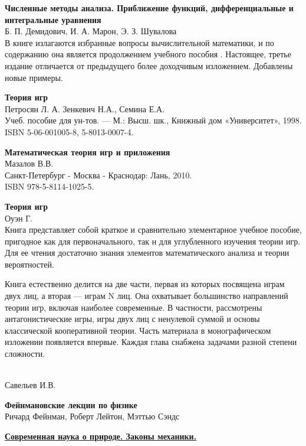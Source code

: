 \begin{thebibliography}{99}
\textbf{Численные методы анализа. Приближение функций, дифференциальные и
интегральные уравнения}\\
Б. П. Демидович, И. А. Марон, Э. З. Шувалова\\
В книге излагаются избранные вопросы вычислительной математики, и по содержанию
она является продолжением учебного пособия \cite{demacalc}.
Настоящее, третье издание отличается от предыдущего более доходчивым изложением.
Добавлены новые примеры.


\textbf{Теория игр}\\
Петросян Л. А. Зенкевич Н.А., Семина Е.А.\\
Учеб. пособие для ун-тов. — М.: Высш.
шк., Книжный дом «Университет», 1998.\\
ISBN 5-06-001005-8, 5-8013-0007-4.

\textbf{Математическая теория игр и приложения}\\
Мазалов В.В.\\
Санкт-Петербург - Москва - Краснодар: Лань, 2010.\\
ISBN 978-5-8114-1025-5.

\textbf{Теория игр}\\
Оуэн Г.\\
Книга представляет собой краткое и сравнительно элементарное учебное пособие,
пригодное как для первоначального, так н для углубленного изучения теории игр.
Для ее чтения достаточно знания элементов математического анализа и теории
вероятностей.

Книга естественно делится на две части, первая из которых посвящена играм двух
лиц, а вторая — играм N лиц. Она охватывает большинство направлений теории игр,
включая наиболее современные. В частности, рассмотрены антагонистические игры,
игры двух лиц с ненулевой суммой и основы классической кооперативной теории.
Часть материала в монографическом изложении появляется впервые. Каждая глава
снабжена задачами разной степени сложности.


 \\
Савельев И.В.

\textbf{Фейнмановские лекции по физике}\\
Ричард Фейнман, Роберт Лейтон, Мэттью Сэндс

\href{https://drive.google.com/file/d/0B0u4WeMjO894SG9RdUtzZWVhQ1E/view?usp=sharing}{\textbf{Современная
наука о природе. Законы механики.}}


\end{thebibliography}
